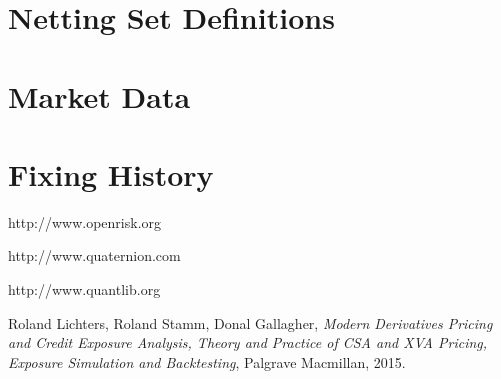 \documentclass[12pt, a4paper]{article}
\begin{document}


\section{Netting Set Definitions}\label{sec:nettingsetinput}



\section{Market Data}\label{sec:market_data}



\section{Fixing History}




\begin{thebibliography}{*}

 http://www.openrisk.org

 http://www.quaternion.com

 http://www.quantlib.org
 
Roland Lichters, Roland Stamm, Donal Gallagher, 
{\em Modern Derivatives Pricing and Credit Exposure Analysis, Theory and Practice of CSA and XVA Pricing, Exposure Simulation and Backtesting}, 
Palgrave Macmillan, 2015.


\end{thebibliography}
\end{document}
